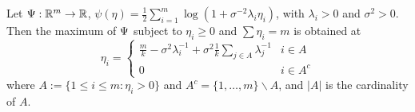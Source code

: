\begin{proposition}\label{prop:kkt}
  Let $\Psi: \mathbb{R}^m \to \mathbb{R}$, $\psi(\eta) =
  \frac{1}{2}\sum_{i=1}^m \log (1+\sigma^{-2}\lambda_i \eta_i)$, with
  $\lambda_i > 0$ and $\sigma^{2} > 0$. Then the maximum of $\Psi$
  subject to $\eta_i \geq 0$ and $\sum\eta_i = m$ is obtained at
  \begin{equation}
  \eta_i = \begin{cases}
    \frac{m}{k} - \sigma^2 \lambda_i^{-1} + \sigma^2 \frac{1}{k} \sum_{j\in A} \lambda_j^{-1} & i \in A \\
    0 & i \in A^c
  \end{cases}
  \end{equation}
  where $A:= \{1\leq i \leq m: \eta_i > 0\}$ and $A^c = \{1,\dots, m\}
    \backslash A$, and $|A|$ is the cardinality of $A$.
\end{proposition}



